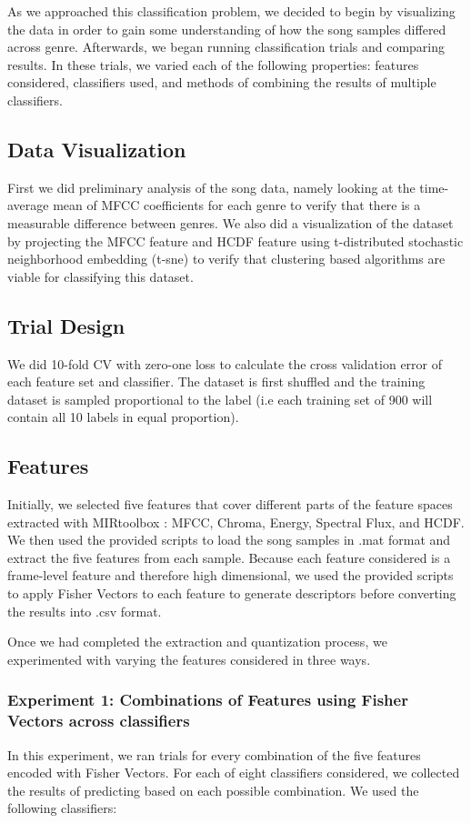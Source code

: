 As we approached this classification problem, we decided to begin by visualizing the data in order to gain some understanding of how the song samples differed across genre. Afterwards, we began running classification trials and comparing results. In these trials, we varied each of the following properties: features considered, classifiers used, and methods of combining the results of multiple classifiers.

\subsection{Data Visualization}
First we did preliminary analysis of the song data, namely looking at the time-average mean of MFCC coefficients for each genre to verify that there is a measurable difference between genres. We also did a visualization of the dataset by projecting the MFCC feature and HCDF feature using t-distributed stochastic neighborhood embedding (t-sne) \cite{tsne} to verify that clustering based algorithms are viable for classifying this dataset.

\subsection{Trial Design}
We did 10-fold CV with zero-one loss to calculate the cross validation error of each feature set and classifier. The dataset is first shuffled and the training dataset is sampled proportional to the label (i.e each training set of 900 will contain all 10 labels in equal proportion).

\subsection{Features}
Initially, we selected five features that cover different parts of the feature spaces extracted with MIRtoolbox \cite{MIR}: MFCC, Chroma, Energy, Spectral Flux, and HCDF. We then used the provided scripts to load the song samples in .mat format and extract the five features from each sample. Because each feature considered is a frame-level feature and therefore high dimensional, we used the provided scripts to apply Fisher Vectors to each feature to generate descriptors before converting the results into .csv format. 

Once we had completed the extraction and quantization process, we experimented with varying the features considered in three ways.

\subsubsection{Experiment 1: Combinations of Features using Fisher Vectors across classifiers}
In this experiment, we ran trials for every combination of the five features encoded with Fisher Vectors. For each of eight classifiers considered, we collected the results of predicting based on each possible combination. We used the following classifiers:

